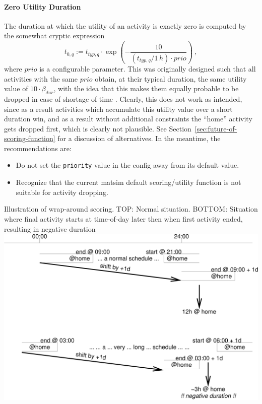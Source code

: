 \paragraph*{Zero Utility Duration}

The duration at which the utility of an activity is exactly zero is computed by the somewhat cryptic expression
\[
t_{0,q} := t_{typ,q} \cdot \exp\left( - \frac{10}{(t_{typ,q}/1\,h) \cdot prio} \right) \ ,
\]
where $prio$ is a configurable parameter. This was originally designed such that all activities with the same $prio$ obtain, at their typical duration, the same utility value of $10 \cdot \beta_{dur}$, with the idea that this makes them equally probable to be dropped in case of shortage of time \citep{CharyparNagel2005ga4acts}. Clearly, this does not work as intended, since as a result activities which accumulate this utility value over a short duration win, and as a result without additional constraints the ``home'' activity gets dropped first, which is clearly not plausible. See Section~\ref{sec:future-of-scoring-function} for a discussion of alternatives. In the meantime, the recommendations are:
\begin{itemize}\styleItemize
\item Do not set the \lstinline$priority$ value in the config away from its default value.
\item Recognize that the current \gls{matsim} default scoring/utility function is not suitable for activity dropping.
\end{itemize}


%
{Illustration of wrap-around scoring. TOP: Normal situation. BOTTOM: Situation where final activity starts at time-of-day later then when first activity ended, resulting in negative duration}%
{\label{tab:negative-durations}}%
{\includegraphics[width=0.8\hsize,trim=0 0 0 0,clip]{using/figures/negative-duration}}%
{}

